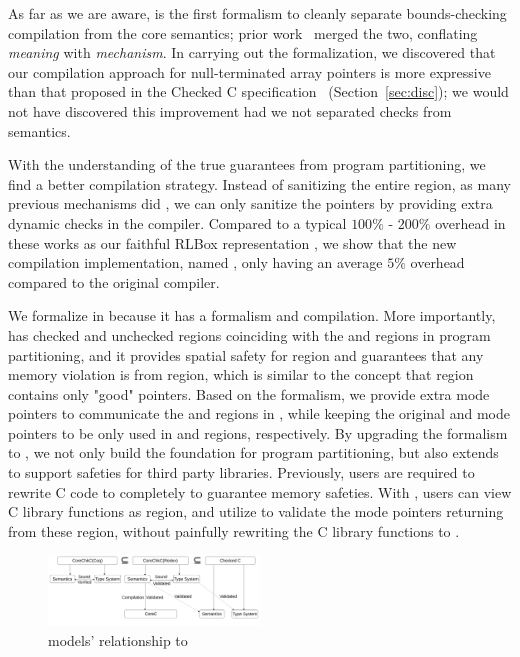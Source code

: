As far as we are aware, \lang is the first formalism to cleanly
separate bounds-checking compilation from the core semantics; prior
work~\cite{Feng2006,Condit2007} merged the two, conflating
\emph{meaning} with \emph{mechanism}. In carrying out the
formalization, we discovered that our compilation approach for
null-terminated array pointers is more expressive than that proposed
in the Checked C specification~\cite{checkedc}
(Section~\ref{sec:disc}); we would not have discovered this
improvement had we not separated checks from semantics.

With the understanding of the true guarantees from program partitioning, we find a better compilation strategy.
Instead of sanitizing the entire \umode region, as many previous mechanisms did \cite{rlbox-paper},
we can only sanitize the \tmode pointers by providing extra dynamic checks in the compiler.
Compared to a typical $100\%$ - $200\%$ overhead in these works \cite{rlbox-paper} as our faithful RLBox representation \systemnamea,
we show that the new compilation implementation, named \systemnameh, only having an average $5\%$ overhead compared to the original \checkedc compiler.

We formalize \systemname in \checkedc \cite{li22checkedc} because it has a formalism and compilation.
More importantly, \checkedc has checked and unchecked regions coinciding with the \cmode and \umode regions in program partitioning,
and it provides spatial safety for \cmode region and guarantees that any memory violation is from \umode region,
which is similar to the concept that \cmode region contains only "good" pointers.
Based on the \checkedc formalism, we provide extra \tmode mode pointers to communicate the \cmode and \umode regions in \checkedc, while keeping the original \cmode and \umode mode pointers to be only used in \cmode and \umode regions, respectively.
By upgrading the \checkedc formalism to \systemname, we not only build the foundation for program partitioning, but also extends \checkedc
to support safeties for third party libraries. Previously, users are required to rewrite C code to \checkedc completely to guarantee memory safeties. With \systemname, users can view C library functions as \umode region, and utilize \systemname to validate the \tmode mode pointers returning from these \umode region, without painfully rewriting the C library functions to \checkedc.


\begin{figure}
\includegraphics[width=0.5\textwidth]{relationship.pdf}
\caption{
    \lang models' relationship to \checkedc
}
  \label{fig:model-relation}
\end{figure}

